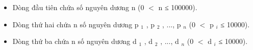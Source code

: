\begin{itemize}
	\item     Dòng đầu tiên chứa số nguyên dương n (0 $<$ n ≤ 100000).   
	\item     Dòng thứ hai chứa n số nguyên dương p    $_     1    $    , p    $_     2    $    , ..., p    $_     n    $    (0 $<$ p    $_     i    $    ≤ 10000).   
	\item     Dòng thứ ba chứa n số nguyên dương d    $_     1    $    , d    $_     2    $    , ..., d    $_     n    $    (0 $<$ d    $_     i    $    ≤ 10000).   
\end{itemize}